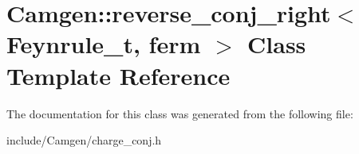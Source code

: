 \hypertarget{a00466}{\section{Camgen\-:\-:reverse\-\_\-conj\-\_\-right$<$ Feynrule\-\_\-t, ferm $>$ Class Template Reference}
\label{a00466}
}


The documentation for this class was generated from the following file\-:\begin{DoxyCompactItemize}
\item 
include/\-Camgen/charge\-\_\-conj.\-h\end{DoxyCompactItemize}
